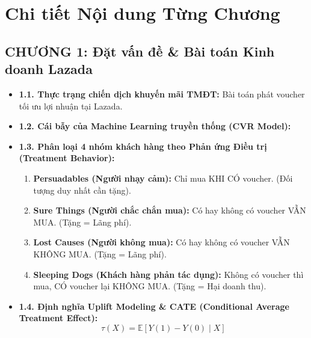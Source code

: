 \newpage

\section*{Chi tiết Nội dung Từng Chương}

\subsection*{CHƯƠNG 1: Đặt vấn đề \& Bài toán Kinh doanh Lazada}
\begin{itemize}[leftmargin=*]
    \item \textbf{1.1. Thực trạng chiến dịch khuyến mãi TMĐT:} Bài toán phát voucher tối ưu lợi nhuận tại Lazada.
    \item \textbf{1.2. Cái bẫy của Machine Learning truyền thống (CVR Model):} 
    \item \textbf{1.3. Phân loại 4 nhóm khách hàng theo Phản ứng Điều trị (Treatment Behavior):}
    \begin{enumerate}
        \item \textbf{Persuadables (Người nhạy cảm):} Chỉ mua KHI CÓ voucher. (Đối tượng duy nhất cần tặng).
        \item \textbf{Sure Things (Người chắc chắn mua):} Có hay không có voucher VẪN MUA. (Tặng = Lãng phí).
        \item \textbf{Lost Causes (Người không mua):} Có hay không có voucher VẪN KHÔNG MUA. (Tặng = Lãng phí).
        \item \textbf{Sleeping Dogs (Khách hàng phản tác dụng):} Không có voucher thì mua, CÓ voucher lại KHÔNG MUA. (Tặng = Hại doanh thu).
    \end{enumerate}
    \item \textbf{1.4. Định nghĩa Uplift Modeling \& CATE (Conditional Average Treatment Effect):}
    \begin{equation*}
        \tau(X) = \mathbb{E}[Y(1) - Y(0) \mid X]
    \end{equation*}
\end{itemize}

